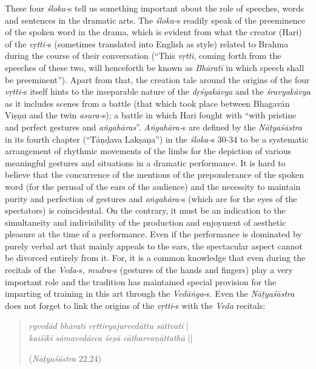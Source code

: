 These four \textsl{śloka-}s tell us something important about the role of speeches, words and sentences in the dramatic arts. The \textsl{śloka-}s readily speak of the preeminence of the spoken word in the drama, which is evident from what the creator (Hari) of the \textsl{vṛtti-}s (sometimes translated into English as style) related to Brahma during the course of their conversation (“This \textsl{vṛtti}, coming forth from the speeches of these two, will henceforth be known as \textsl{Bhāratī} in which speech shall be preeminent”). Apart from that, the creation tale around the origins of the four \textsl{vṛtti-}s itself hints to the inseparable nature of the \textsl{dṛśyakāvya} and the \textsl{śravyakāvya} as it includes scenes from a battle (that which took place between Bhagavān Viṣṇu and the twin \textsl{asura-}s); a battle in which Hari fought with “with pristine and perfect gestures and \textsl{aṅgahāras}”. \textsl{Aṅgahāra-}s are defined by the \textsl{Nāṭyaśāstra} in its fourth chapter (“Tāṇḍava Lakṣaṇa”) in the \textsl{śloka-}s 30-34 to be a systematic arrangement of rhythmic movements of the limbs for the depiction of various meaningful gestures and situations in a dramatic performance. It is hard to believe that the concurrence of the mentions of the preponderance of the spoken word (for the perusal of the ears of the audience) and the necessity to maintain purity and perfection of gestures and \textsl{aṅgahāra-}s (which are for the eyes of the spectators) is coincidental. On the contrary, it must be an indication to the simultaneity and indivisibility of the production and enjoyment of aesthetic pleasure at the time of a performance. Even if the performance is dominated by purely verbal art that mainly appeals to the ears, the spectacular aspect cannot be divorced entirely from it. For, it is a common knowledge that even during the recitals of the \textsl{Veda}-s, \textsl{mudra}-s (gestures of the hands and fingers) play a very important role and the tradition has maintained special provision for the imparting of training in this art through the \textsl{Vedāṅga}-s. Even the \textsl{Nāṭyaśāstra} does not forget to link the origins of the \textsl{vṛtti}-s with the \textsl{Veda} recitals: 
\begin{quote}
\textsl{ṛgvedād bhāratī vṛttiryajurvedāttu sāttvatī} |    \\
\textsl{kaiśikī sāmavedācca śeṣā cātharvaņāttathā} ||

\hfill(\textsl{Nāṭyaśāstra} 22.24)
\end{quote}

